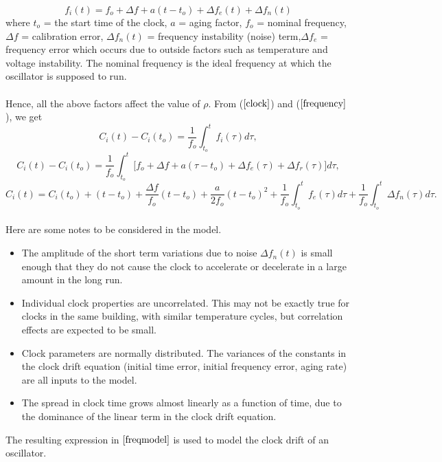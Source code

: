 \documentclass[a4paper,10pt]{report}
\begin{document}
\begin{equation}
f_i(t) = f_o + \Delta f + a(t-t_o) + \Delta f_e(t) + \Delta f_n(t)
\label{frequency}
\end{equation}
where \newline $t_o$ = the start time of the clock, \newline $a$ = aging factor, \newline $f_o$ = nominal frequency, \newline $\Delta
f$ = calibration error, \newline $\Delta f_n(t)$ = frequency instability (noise) term,\newline $\Delta f_e$ = frequency error which occurs
due to outside factors such as temperature and voltage instability.\newline
The nominal frequency is the ideal frequency at which the oscillator is supposed to run. \paragraph*{} Hence, all the above factors affect the value of $\rho$. From ($\ref{clock}$) and ($\ref{frequency}$), we get
\begin{equation}
C_i(t) - C_i(t_o) = \frac{1}{f_o} \int^{t}_{t_o}f_i(\tau)d\tau ,
\end{equation}
\begin{equation}
C_i(t) - C_i(t_o) = \frac{1}{f_o} \int^{t}_{t_o}{[f_o + \Delta f + a(\tau-t_o)  } + \Delta f_e(\tau) + \Delta f_r(\tau)]d\tau ,
\label{fasika}
\end{equation}
\begin{equation}
C_i(t) =  C_i(t_o) + (t-t_o) +\frac{\Delta f}{f_o}(t-t_o) + \frac{a}{2f_o}(t-t_o)^2 + \frac{1}{f_o}\int^{t}_{t_o}{f_e(\tau)d\tau} +
\frac{1}{f_o}\int^{t}_{t_o}{\Delta f_n(\tau)d\tau} .
\label{freqmodel}
\end{equation}
\paragraph*{}
Here are some notes to be considered in the model.
\begin{itemize}
\item The amplitude of the short term variations due to noise $\Delta f_n(t)$ is small enough that they do not cause the clock to accelerate or decelerate in a large amount in the long run.
\item Individual clock properties are uncorrelated. This may not be exactly true for clocks in the same building, with similar temperature cycles, but correlation effects are expected to be small.
\item Clock parameters are normally distributed. The variances of the constants in the clock drift equation (initial time error,
initial frequency error, aging rate) are all inputs to the model.
\item The spread in clock time grows almost linearly as a function of time, due to the dominance of the linear term in the clock drift equation.
\end{itemize}
The resulting expression in $\ref{freqmodel}$ is used to model the clock drift of an oscillator.
\end{document}

